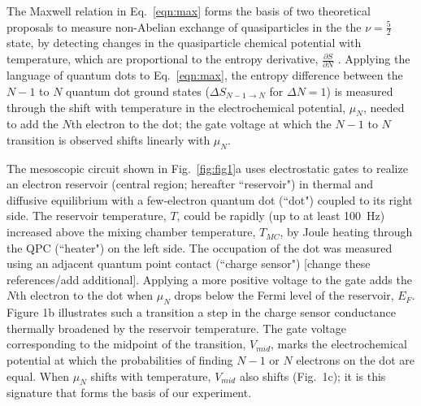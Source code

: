 \documentclass[twocolumn,showpacs,amsmath,amssymb,prl,aps,superscriptaddress]{revtex4-1}
\begin{document}
The Maxwell relation in Eq.~\ref{eqn:max} forms the basis of two theoretical proposals to measure non-Abelian exchange of quasiparticles in the the $\nu = \frac{5}{2}$ state, by detecting changes in the quasiparticle chemical potential with temperature, which are proportional to the entropy derivative, $\frac{\partial S}{\partial N}$ \cite{Cooper2009,Ben-Shach2013}. Applying the language of quantum dots to Eq.~\ref{eqn:max}, the entropy difference between the $N-1$ to $N$ quantum dot ground states ($\Delta S_{N-1\rightarrow N}$ for $\Delta N=1$) is measured through the shift with temperature in the electrochemical potential, $\mu_N$, needed to add the $N$th electron to the dot; the gate voltage at which the $N-1$ to $N$ transition is observed shifts linearly with $\mu_{N}$.

The mesoscopic circuit shown in Fig.~\ref{fig:fig1}a uses electrostatic gates to realize an electron reservoir (central region; hereafter ``reservoir") in thermal and diffusive equilibrium with a few-electron quantum dot (``dot") coupled to its right side.  The reservoir temperature, $T$, could be rapidly (up to at least \SI{100}{\hertz}) increased above the mixing chamber temperature, $T_{MC}$, by Joule heating through the QPC (``heater") on the left side.  The occupation of the dot was measured using an adjacent quantum point contact (``charge sensor")\cite{Staring2007, Thierschmann2015} [change these references/add additional].  Applying a more positive voltage to the gate adds the $N$th electron to the dot when $\mu_{N}$ drops below the Fermi level of the reservoir, $E_F$. Figure 1b illustrates such a transition \textemdash a step in the charge sensor conductance \textemdash thermally broadened by the reservoir temperature.  The gate voltage corresponding to the midpoint of the transition, $V_{mid}$, marks the electrochemical potential at which the probabilities of finding $N-1$ or $N$ electrons on the dot are equal.  When $\mu_N$ shifts with temperature, $V_{mid}$ also shifts (Fig.~1c); it is this signature that forms the basis of our experiment.
\end{document}

